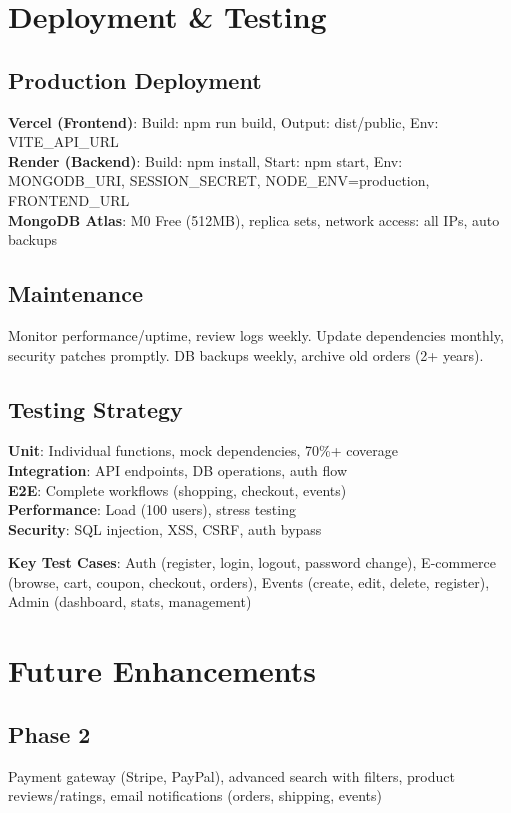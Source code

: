 \documentclass[10pt]{article}
\begin{document}
\section{Deployment \& Testing}

\subsection{Production Deployment}
\textbf{Vercel (Frontend)}: Build: npm run build, Output: dist/public, Env: VITE\_API\_URL\\
\textbf{Render (Backend)}: Build: npm install, Start: npm start, Env: MONGODB\_URI, SESSION\_SECRET, NODE\_ENV=production, FRONTEND\_URL\\
\textbf{MongoDB Atlas}: M0 Free (512MB), replica sets, network access: all IPs, auto backups

\subsection{Maintenance}
Monitor performance/uptime, review logs weekly. Update dependencies monthly, security patches promptly. DB backups weekly, archive old orders (2+ years).

\subsection{Testing Strategy}
\textbf{Unit}: Individual functions, mock dependencies, 70\%+ coverage\\
\textbf{Integration}: API endpoints, DB operations, auth flow\\
\textbf{E2E}: Complete workflows (shopping, checkout, events)\\
\textbf{Performance}: Load (100 users), stress testing\\
\textbf{Security}: SQL injection, XSS, CSRF, auth bypass

\textbf{Key Test Cases}: Auth (register, login, logout, password change), E-commerce (browse, cart, coupon, checkout, orders), Events (create, edit, delete, register), Admin (dashboard, stats, management)

\section{Future Enhancements}

\subsection{Phase 2}
Payment gateway (Stripe, PayPal), advanced search with filters, product reviews/ratings, email notifications (orders, shipping, events)
\end{document}
